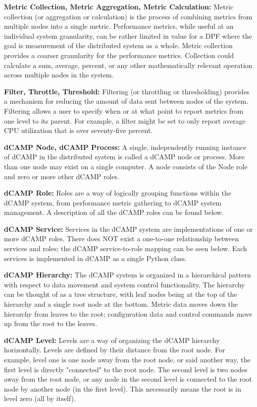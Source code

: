 \textbf{Metric Collection, Metric Aggregation, Metric Calculation:} Metric collection (or aggregation or calculation) is the process of combining metrics from multiple nodes into a single metric. Performance metrics, while useful at an individual system granularity, can be rather limited in value for a DPF where the goal is measurement of the distributed system as a whole. Metric collection provides a coarser granularity for the performance metrics. Collection could calculate a sum, average, percent, or any other mathematically relevant operation across multiple nodes in the system. 

\textbf{Filter, Throttle, Threshold:} Filtering (or throttling or thresholding) provides a mechanism for reducing the amount of data sent between nodes of the system. Filtering allows a user to specify when or at what point to report metrics from one level to its parent. For example, a filter might be set to only report average CPU utilization that is over seventy-five percent. 

\textbf{dCAMP Node, dCAMP Process:} A single, independently running instance of dCAMP in the distributed system is called a dCAMP node or process. More than one node may exist on a single computer. A node consists of the Node role and zero or more other dCAMP roles. 

\textbf{dCAMP Role:} Roles are a way of logically grouping functions within the dCAMP system, from performance metric gathering to dCAMP system management. A description of all the dCAMP roles can be found below. 

\textbf{dCAMP Service:} Services in the dCAMP system are implementations of one or more dCAMP roles. There does NOT exist a one-to-one relationship between services and roles; the dCAMP service-to-role mapping can be seen below. Each services is implemented in dCAMP as a single Python class. 

\textbf{dCAMP Hierarchy:} The dCAMP system is organized in a hierarchical pattern with respect to data movement and system control functionality. The hierarchy can be thought of as a tree structure, with leaf nodes being at the top of the hierarchy and a single root node at the bottom. Metric data moves down the hierarchy from leaves to the root; configuration data and control commands move up from the root to the leaves. 

\textbf{dCAMP Level:} Levels are a way of organizing the dCAMP hierarchy horizontally. Levels are defined by their distance from the root node. For example, level one is one node away from the root node, or said another way, the first level is directly "connected" to the root node. The second level is two nodes away from the root node, or any node in the second level is connected to the root node by another node (in the first level). This necessarily means the root is in level zero (all by itself). 

